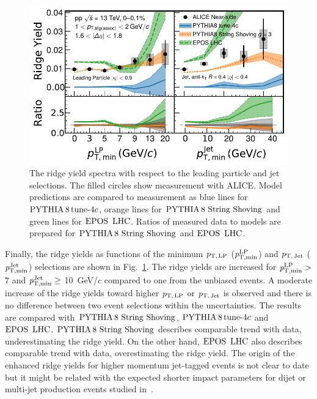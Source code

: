 \begin{figure}[h!]
	\centering
	\includegraphics[width=0.99\linewidth]{./figures/Fig6_RidgeYieldESE.pdf}
	\caption{The ridge yield spectra with respect to the leading particle and jet selections. The filled circles show measurement with ALICE. Model predictions are compared to measurement as blue lines for $\mathrm{PYTHIA}\,8\,\mathrm{tune}{\text -}4c$, orange lines for ${\mathrm{PYTHIA}\,8~\mathrm{String}~}\mathrm{Shoving}$ and green lines for ${\mathrm{EPOS}\,~\mathrm{LHC}}$. Ratios of measured data to models are prepared for ${\mathrm{PYTHIA}\,8~\mathrm{String}~}\mathrm{Shoving}$ and ${\mathrm{EPOS}\,~\mathrm{LHC}}$.}
	\label{fig:RidgeYield_ESE}
\end{figure}

Finally, the ridge yields as functions of the minimum $p_\mathrm{T,\,LP}$ ($\it{p}^{\rm{LP}}_{\rm{T,min}}$) and $p_\mathrm{T,\,Jet}$ ($\it{p}^{\rm{Jet}}_{\rm{T,min}}$) selections are shown in Fig.~\ref{fig:RidgeYield_ESE}. The ridge yields are increased for $\it{p}^{\rm{LP}}_{\rm{T,min}} >$ 7 and $\it{p}^{\rm{Jet}}_{\rm{T,min}} \ge$ 10~GeV/$c$ compared to one from the unbiased events. A moderate increase of the ridge yields toward higher $p_\mathrm{T,\,LP}$ or $p_\mathrm{T,\,Jet}$ is observed and there is no difference between two event selections within the uncertainties.
The results are compared with ${\mathrm{PYTHIA}\,8~\mathrm{String}~}\mathrm{Shoving}$, $\mathrm{PYTHIA}\,8\,\mathrm{tune}{\text -}4c$ and ${\mathrm{EPOS}\,~\mathrm{LHC}}$. ${\mathrm{PYTHIA}\,8~\mathrm{String}~}\mathrm{Shoving}$ describes comparable trend with data, underestimating the ridge yield. On the other hand, ${\mathrm{EPOS}\,~\mathrm{LHC}}$ also describes comparable trend with data, overestimating the ridge yield. The origin of the enhanced ridge yields for higher momentum jet-tagged events is not clear to date but it might be related with the expected shorter impact parameters for dijet or multi-jet production events studied in~\cite{Frankfurt:2010ea}.

